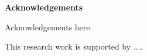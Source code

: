 \begin{center}
\textbf{\large Acknowledgements}
\end{center}

Acknowledgements here.

\par

This research work is supported by .... 
